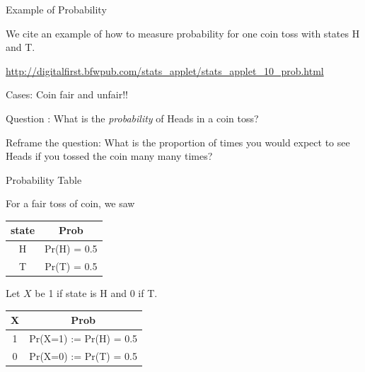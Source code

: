 \documentclass{beamer}\usepackage[]{graphicx}\usepackage[]{color}
\begin{document}
\begin{frame}[fragile]{Example of Probability  \;\;}

We cite an example of how to measure probability for one coin toss with states
H and T.

\url{http://digitalfirst.bfwpub.com/stats_applet/stats_applet_10_prob.html}
\pause \newline

Cases: Coin fair and unfair!! \pause \newline

Question : What is the \emph{probability} of Heads in a coin toss? \pause \newline

Reframe the question: What is the proportion of times you would expect to see
Heads if you tossed the coin many many times? \pause \newline

\end{frame}

\begin{frame}[fragile]{Probability  Table \;\;}

For a fair toss of coin, we saw

\begin{tabular}{|c|c|}
\hline
state & Prob \\ \hline
H & Pr(H) = 0.5\\ \hline
T & Pr(T) = 0.5 \\ \hline
\end{tabular} \pause \newline

Let $X$ be 1 if state is H and 0 if T. \pause \newline

\begin{tabular}{|c|c|}
\hline
X & Prob \\ \hline
1 & Pr(X=1) := Pr(H) = 0.5\\ \hline
0 & Pr(X=0) := Pr(T) = 0.5 \\ \hline
\end{tabular}

\end{frame}
\end{document}
